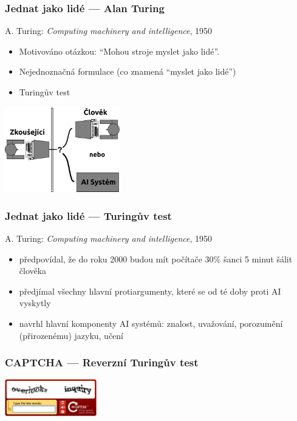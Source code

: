 \documentclass[red,handout,professionalfont]{beamer}
\theoremstyle{definition}
\newcommand{\0}{\mbox{${\bf 0}$}}
\begin{document}
\begin{frame}\frametitle{Jednat jako lidé --- Alan Turing}
\begin{block}{}
 A. Turing: {\it Computing machinery and intelligence}, 1950
\end{block}\pause{}
\begin{itemize}
 \item Motivováno otázkou: ``Mohou stroje myslet jako lidé''.\pause{}
 \item Nejednoznačná formulace (co znamená ``myslet jako lidé'')\pause{}
 \item Turingův test\pause{}
\end{itemize}
\begin{center}
\includegraphics[width=5cm]{turing-test.pdf}
\end{center}
\end{frame}
\begin{frame}\frametitle{Jednat jako lidé --- Turingův test}
\begin{block}{}
 A. Turing: {\it Computing machinery and intelligence}, 1950
\end{block}
\begin{itemize}
 \item předpovídal, že do roku 2000 budou mít počítače 30\% šanci 5 minut šálit člověka\pause{}
 \item předjímal všechny hlavní protiargumenty, které se od té doby proti AI vyskytly\pause{}
 \item navrhl hlavní komponenty AI systémů: znalost, uvažování, porozumění (přirozenému) jazyku, učení
\end{itemize}
\end{frame}

\begin{frame}\frametitle{CAPTCHA --- Reverzní Turingův test}
\begin{center}
 \includegraphics[width=4cm]{recaptcha-example.png}
\end{center}

 
\end{frame}
\end{document}
